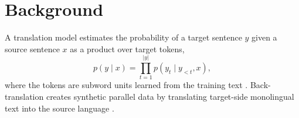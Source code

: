\chapter{Background}
\label{ch:background}

A translation model estimates the probability of a target sentence $y$ given a source sentence
$x$ as a product over target tokens,
\begin{equation}
  p(y \mid x) = \prod_{t=1}^{|y|} p(y_t \mid y_{<t}, x),
  \label{eq:nmt}
\end{equation}
where the tokens are subword units learned from the training text \citep{sennrich2016bpe}.
Back-translation creates synthetic parallel data by translating target-side monolingual text
into the source language \citep{sennrich2016bt}.
